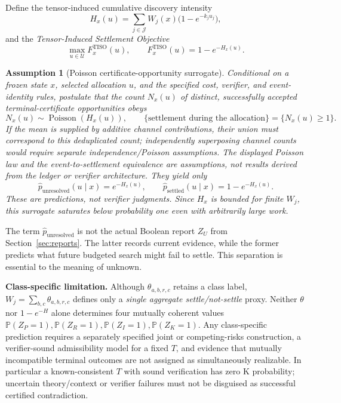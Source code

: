 \documentclass[11pt]{article}
\newtheorem{assumption}[definition]{Assumption}
\newcommand{\Jset}{\mathcal J}
\newcommand{\Uset}{\mathcal U}
\newcommand{\Prob}{\mathbb P}
\begin{document}
Define the tensor-induced cumulative discovery intensity
\begin{equation}\label{eq:tiso-intensity}
H_x(u)=\sum_{j\in\Jset}W_j(x)\bigl(1-e^{-k_ju_j}\bigr),
\end{equation}
and the \emph{Tensor-Induced Settlement Objective}
\begin{equation}\label{eq:tiso-main}
\boxed{\quad\max_{u\in\Uset}F_x^{\mathrm{TISO}}(u),\qquad F_x^{\mathrm{TISO}}(u)=1-e^{-H_x(u)}.\quad}
\end{equation}

\begin{assumption}[Poisson certificate-opportunity surrogate]\label{ass:poisson}
Conditional on a frozen state $x$, selected allocation $u$, and the specified cost, verifier, and event-identity rules, postulate that the count $N_x(u)$ of \emph{distinct, successfully accepted terminal-certificate opportunities} obeys
\[
N_x(u)\sim\operatorname{Poisson}(H_x(u)),\qquad
\{\text{settlement during the allocation}\}=\{N_x(u)\ge1\}.
\]
If the mean is supplied by additive channel contributions, their union must correspond to this deduplicated count; independently superposing channel counts would require separate independence/Poisson assumptions. The displayed Poisson law and the event-to-settlement equivalence are assumptions, not results derived from the ledger or verifier architecture. They yield only
\begin{equation}\label{eq:tiso-prob}
\widehat p_{\mathrm{unresolved}}(u\mid x)=e^{-H_x(u)},\qquad
\widehat p_{\mathrm{settled}}(u\mid x)=1-e^{-H_x(u)}.
\end{equation}
These are \emph{predictions}, not verifier judgments. Since $H_x$ is bounded for finite $W_j$, this surrogate saturates below probability one even with arbitrarily large work.
\end{assumption}

The term $\widehat p_{\mathrm{unresolved}}$ is not the actual Boolean report $Z_U$ from Section~\ref{sec:reports}. The latter records current evidence, while the former predicts what future budgeted search might fail to settle. This separation is essential to the meaning of unknown.

\noindent\textbf{Class-specific limitation.} Although $\theta_{a,b,r,c}$ retains a class label, $W_j=\sum_{b,c}\theta_{a,b,r,c}$ defines only a \emph{single aggregate settle/not-settle} proxy. Neither $\theta$ nor $1-e^{-H}$ alone determines four mutually coherent values $\Prob(Z_P=1),\Prob(Z_R=1),\Prob(Z_I=1),\Prob(Z_K=1)$. Any class-specific prediction requires a separately specified joint or competing-risks construction, a verifier-sound admissibility model for a fixed $T$, and evidence that mutually incompatible terminal outcomes are not assigned as simultaneously realizable. In particular a known-consistent $T$ with sound verification has zero K probability; uncertain theory/context or verifier failures must not be disguised as successful certified contradiction.
\end{document}
